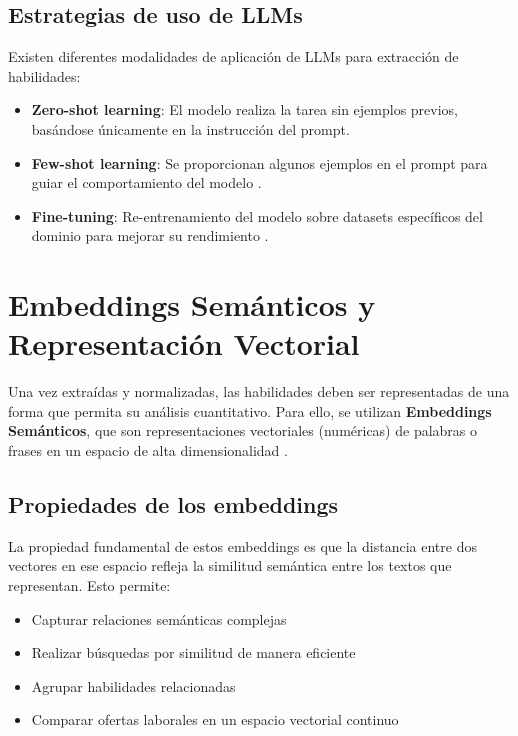 \subsection{Estrategias de uso de LLMs}

Existen diferentes modalidades de aplicación de LLMs para extracción de habilidades:

\begin{itemize}
    \item \textbf{Zero-shot learning}: El modelo realiza la tarea sin ejemplos previos, basándose únicamente en la instrucción del prompt.
    \item \textbf{Few-shot learning}: Se proporcionan algunos ejemplos en el prompt para guiar el comportamiento del modelo \cite{nguyen2024}.
    \item \textbf{Fine-tuning}: Re-entrenamiento del modelo sobre datasets específicos del dominio para mejorar su rendimiento \cite{herandi2024, zhang2022}.
\end{itemize}

\section{Embeddings Semánticos y Representación Vectorial}

Una vez extraídas y normalizadas, las habilidades deben ser representadas de una forma que permita su análisis cuantitativo. Para ello, se utilizan \textbf{Embeddings Semánticos}, que son representaciones vectoriales (numéricas) de palabras o frases en un espacio de alta dimensionalidad \cite{kavas2024}.

\subsection{Propiedades de los embeddings}

La propiedad fundamental de estos embeddings es que la distancia entre dos vectores en ese espacio refleja la similitud semántica entre los textos que representan. Esto permite:

\begin{itemize}
    \item Capturar relaciones semánticas complejas
    \item Realizar búsquedas por similitud de manera eficiente
    \item Agrupar habilidades relacionadas
    \item Comparar ofertas laborales en un espacio vectorial continuo
\end{itemize}

